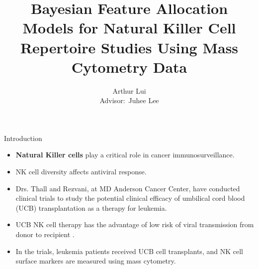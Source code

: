 \documentclass[ignorenonframetext,]{beamer}
\title[Bayesian FAM for CyTOF Data]{Bayesian Feature Allocation Models for Natural Killer Cell Repertoire Studies Using Mass Cytometry Data}
\author[A. Lui]{Arthur Lui \\ {\small Advisor$\colon$ Juhee Lee}}
\institute{Department of Applied Mathematics and Statistics\\ UC Santa Cruz}
\begin{document}


\begin{frame}{Introduction}
  \begin{itemize}
    \setlength\itemsep{1em}
    \item
      \textbf{Natural Killer cells} play a critical role in cancer immunosurveillance.
    \item NK cell diversity affects antiviral response.
    \item Drs. Thall and Rezvani, at MD Anderson Cancer
      Center, have conducted clinical trials to study the potential clinical
      efficacy of umbilical cord blood (UCB) transplantation as a therapy for
      leukemia.
    \item UCB NK cell therapy has the advantage of low risk of viral
      transmission from donor to recipient \citep{sarvaria2017umbilical}.
    \item In the trials, leukemia patients received UCB cell transplants, and
      NK cell surface markers are measured using mass cytometry.
  \end{itemize}
\end{frame}
\end{document}

